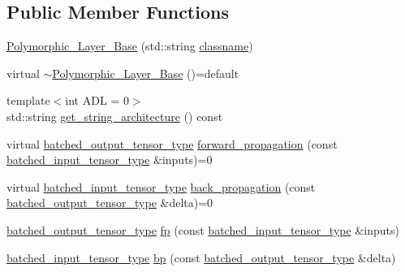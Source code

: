 \subsection*{Public Member Functions}
\begin{DoxyCompactItemize}
\item 
\hyperlink{structbc_1_1nn_1_1Polymorphic__Layer__Base_a1b02e9a8e1b085c3b1eda984de21ce93}{Polymorphic\+\_\+\+Layer\+\_\+\+Base} (std\+::string \hyperlink{structbc_1_1nn_1_1Polymorphic__Layer__Base_a3a63312d3100e6a6c31ba6bd16578aa7}{classname})
\item 
virtual \hyperlink{structbc_1_1nn_1_1Polymorphic__Layer__Base_a6d3d973826a90e84e1f1ef3127198388}{$\sim$\+Polymorphic\+\_\+\+Layer\+\_\+\+Base} ()=default
\item 
{\footnotesize template$<$int A\+DL = 0$>$ }\\std\+::string \hyperlink{structbc_1_1nn_1_1Polymorphic__Layer__Base_a987b737aeb1b1000dcb1b67ea551087b}{get\+\_\+string\+\_\+architecture} () const
\item 
virtual \hyperlink{structbc_1_1nn_1_1Polymorphic__Layer__Base_a45ed57549be9c4e5c40c52168ca15ae9}{batched\+\_\+output\+\_\+tensor\+\_\+type} \hyperlink{structbc_1_1nn_1_1Polymorphic__Layer__Base_a0dc71591b6ca387501c2cace61be3e78}{forward\+\_\+propagation} (const \hyperlink{structbc_1_1nn_1_1Polymorphic__Layer__Base_ae694b03dd73923ff973b0d2c9156e161}{batched\+\_\+input\+\_\+tensor\+\_\+type} \&inputs)=0
\item 
virtual \hyperlink{structbc_1_1nn_1_1Polymorphic__Layer__Base_ae694b03dd73923ff973b0d2c9156e161}{batched\+\_\+input\+\_\+tensor\+\_\+type} \hyperlink{structbc_1_1nn_1_1Polymorphic__Layer__Base_ae68fb249544a51c79be7aca6fb4a0727}{back\+\_\+propagation} (const \hyperlink{structbc_1_1nn_1_1Polymorphic__Layer__Base_a45ed57549be9c4e5c40c52168ca15ae9}{batched\+\_\+output\+\_\+tensor\+\_\+type} \&delta)=0
\item 
\hyperlink{structbc_1_1nn_1_1Polymorphic__Layer__Base_a45ed57549be9c4e5c40c52168ca15ae9}{batched\+\_\+output\+\_\+tensor\+\_\+type} \hyperlink{structbc_1_1nn_1_1Polymorphic__Layer__Base_a71ab20a7baff5faf1c3d5ff16552a983}{fp} (const \hyperlink{structbc_1_1nn_1_1Polymorphic__Layer__Base_ae694b03dd73923ff973b0d2c9156e161}{batched\+\_\+input\+\_\+tensor\+\_\+type} \&inputs)
\item 
\hyperlink{structbc_1_1nn_1_1Polymorphic__Layer__Base_ae694b03dd73923ff973b0d2c9156e161}{batched\+\_\+input\+\_\+tensor\+\_\+type} \hyperlink{structbc_1_1nn_1_1Polymorphic__Layer__Base_a317faf7f621b09947ac22385d26e61e4}{bp} (const \hyperlink{structbc_1_1nn_1_1Polymorphic__Layer__Base_a45ed57549be9c4e5c40c52168ca15ae9}{batched\+\_\+output\+\_\+tensor\+\_\+type} \&delta)

\end{DoxyCompactItemize}
